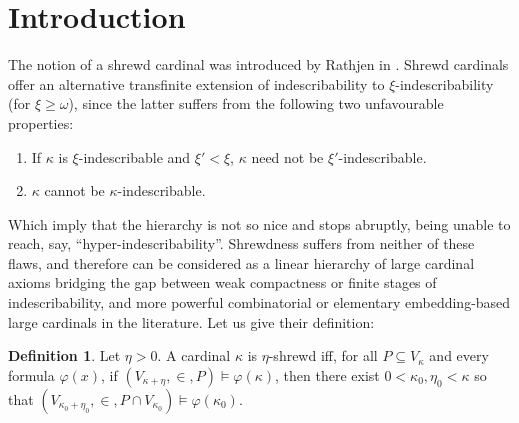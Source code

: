 \documentclass{article}
\title{\rfont \mytitle}
\author{\authorfont \myauthor}
\date{\rfont \today}
\theoremstyle{definition}
\newtheorem{definition}{Definition}[section]
\theoremstyle{plain}
\theoremstyle{plain}
\theoremstyle{plain}
\theoremstyle{plain}
\theoremstyle{remark}
\theoremstyle{remark}
\theoremstyle{remark}
\theoremstyle{plain}
\theoremstyle{plain}
\theoremstyle{plain}
\begin{document}
\maketitle

\begin{abstract}
We share both recent and older, well-known results regarding the notions of stable ordinals and shrewd cardinals. We then argue that nonprojectible ordinals may be considered as recursive analogues to subtle cardinals, a highly combinatorial type of cardinal related to Jensen's fine structure, due to the latter possessing a characterisation in terms of shrewdnesss.
\end{abstract}

\section{Introduction}

The notion of a shrewd cardinal was introduced by Rathjen in \cite{rathjen}. Shrewd cardinals offer an alternative transfinite extension of indescribability to $\xi$-indescribability (for $\xi \geq \omega$), since the latter suffers from the following two unfavourable properties:

\begin{enumerate}
    \item If $\kappa$ is $\xi$-indescribable and $\xi' < \xi$, $\kappa$ need not be $\xi'$-indescribable.
    \item $\kappa$ cannot be $\kappa$-indescribable.
\end{enumerate}

Which imply that the hierarchy is not so nice and stops abruptly, being unable to reach, say, ``hyper-indescribability''. Shrewdness suffers from neither of these flaws, and therefore can be considered as a linear hierarchy of large cardinal axioms bridging the gap between weak compactness or finite stages of indescribability, and more powerful combinatorial or elementary embedding-based large cardinals in the literature. Let us give their definition:

\begin{definition}
\label{ShrewdCardinal}
Let $\eta > 0$. A cardinal $\kappa$ is $\eta$-shrewd iff, for all $P \subseteq V_\kappa$ and every formula $\varphi(x)$, if $(V_{\kappa+\eta}, \in, P) \models \varphi(\kappa)$, then there exist $0 < \kappa_0, \eta_0 < \kappa$ so that $(V_{\kappa_0+\eta_0}, \in, P \cap V_{\kappa_0}) \models \varphi(\kappa_0)$.
\end{definition}
\end{document}

